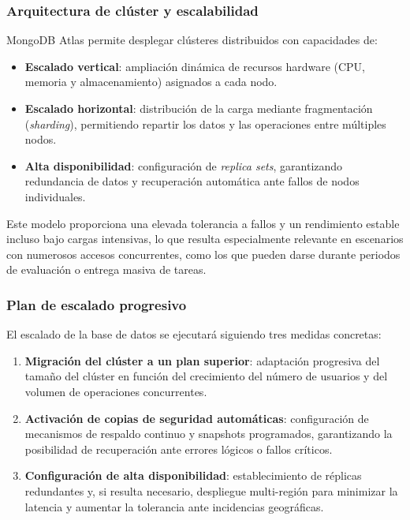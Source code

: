 \subsubsection{Arquitectura de clúster y escalabilidad}

MongoDB Atlas permite desplegar clústeres distribuidos con capacidades de:

\begin{itemize}
    \item \textbf{Escalado vertical}: ampliación dinámica de recursos hardware (CPU, memoria y almacenamiento) asignados a cada nodo.
    
    \item \textbf{Escalado horizontal}: distribución de la carga mediante fragmentación (\textit{sharding}), permitiendo repartir los datos y las operaciones entre múltiples nodos.
    
    \item \textbf{Alta disponibilidad}: configuración de \textit{replica sets}, garantizando redundancia de datos y recuperación automática ante fallos de nodos individuales.
\end{itemize}

Este modelo proporciona una elevada tolerancia a fallos y un rendimiento estable incluso bajo cargas intensivas, lo que resulta especialmente relevante en escenarios con numerosos accesos concurrentes, como los que pueden darse durante periodos de evaluación o entrega masiva de tareas.

\subsubsection{Plan de escalado progresivo}

El escalado de la base de datos se ejecutará siguiendo tres medidas concretas:

\begin{enumerate}
    \item \textbf{Migración del clúster a un plan superior}: adaptación progresiva del tamaño del clúster en función del crecimiento del número de usuarios y del volumen de operaciones concurrentes.
    
    \item \textbf{Activación de copias de seguridad automáticas}: configuración de mecanismos de respaldo continuo y snapshots programados, garantizando la posibilidad de recuperación ante errores lógicos o fallos críticos.
    
    \item \textbf{Configuración de alta disponibilidad}: establecimiento de réplicas redundantes y, si resulta necesario, despliegue multi-región para minimizar la latencia y aumentar la tolerancia ante incidencias geográficas.
\end{enumerate}

